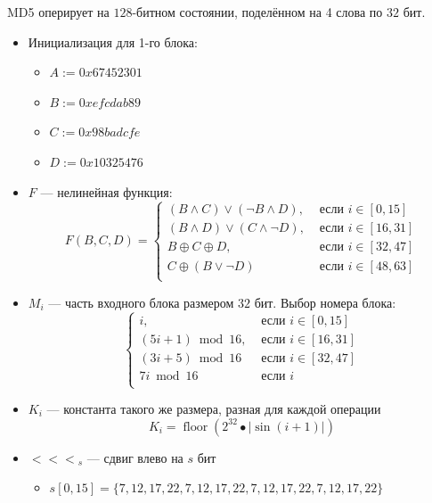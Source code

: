 \documentclass[a4paper, 14pt]{extarticle}
\DeclareMathOperator{\floor}{floor}
\begin{document}
MD5 оперирует на $128$-битном состоянии, поделённом на 4 слова по $32$ бит. 
\begin{itemize}
    \item Инициализация для 1-го блока:
    \begin{itemize}
        \item $A := 0x67452301$
        \item $B := 0xefcdab89$
        \item $ C:= 0x98badcfe $
        \item $D := 0x10325476$
    \end{itemize}
    \item $F$ --- нелинейная функция:
    \begin{equation}
        F(B,C,D) = \begin{cases}
            (B \wedge C) \vee (\neg B \wedge D), &\text{ если } i \in [0, 15]\\
            (B \wedge D) \vee (C \wedge \neg D), &\text{ если } i \in [16, 31]\\
            B \oplus C \oplus D, &\text{ если } i \in [32, 47]\\
            C \oplus (B \vee \neg D) &\text{ если } i \in [48, 63]\\
        \end{cases}
    \end{equation}
    \item $M_i$ --- часть входного блока размером $32$ бит. Выбор номера блока:
    \begin{equation}
        \begin{cases}
            i, &\text{ если } i \in [0, 15]\\
            (5i + 1) \bmod 16, &\text{ если } i \in [16, 31]\\
            (3i + 5) \bmod 16 &\text{ если } i \in [32, 47]\\
            7i \bmod 16 &\text{ если } i \\
        \end{cases}
    \end{equation}
    \item $K_i$ --- константа такого же размера, разная для каждой операции
    \begin{equation}
        K_i = \floor (2^{32} \bullet |\sin(i+1)|)
    \end{equation}
    \item ${<<<}_s$ --- сдвиг влево на $s$ бит
    \begin{itemize}
        \item $s[0, 15] = \{7, 12, 17, 22,  7, 12, 17, 22,  7, 12, 17, 22,  7, 12, 17, 22\}$

\end{itemize}
\end{itemize}
\end{document}
